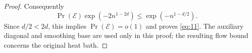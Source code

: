 \begin{proof}
Consequently
\[
 \Pr(\mathcal E)\exp(-2n^{1-2d})
 \le\exp(-n^{1-d/2}).
\]
Since $d/2<2d$, this implies $\Pr(\mathcal E)=o(1)$ and proves
\eqref{eq:11}. The auxiliary diagonal and smoothing base are used
only in this proof; the resulting flow bound concerns the original
heat bath.
\end{proof}
